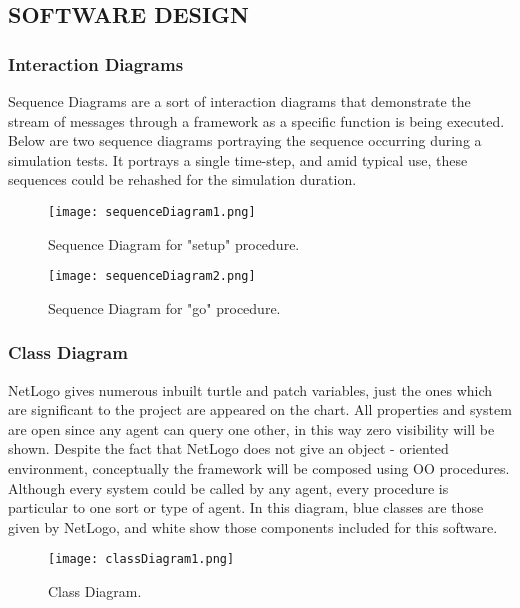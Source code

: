 \documentclass[11pt,a4paper]{article}
\begin{document}
\subsection{SOFTWARE DESIGN}

\subsubsection{\textbf{Interaction Diagrams}}

Sequence Diagrams are a sort of interaction diagrams that demonstrate the stream of messages through a framework as a specific function is being executed. Below are two sequence diagrams portraying the sequence occurring during a simulation tests. It portrays a single time-step, and amid typical use, these sequences could be rehashed for the simulation duration. \newpage

\begin{figure}[!ht]
\centering
\texttt{[image: sequenceDiagram1.png]}
\caption{\label{fig:sd1}Sequence Diagram for "setup" procedure.}
\end{figure}

\begin{figure}[!ht]
\centering
\texttt{[image: sequenceDiagram2.png]}
\caption{\label{fig:sd2}Sequence Diagram for "go" procedure.}
\end{figure}

\newpage
\subsubsection{\textbf{Class Diagram}}

NetLogo gives numerous inbuilt turtle and patch variables, just the ones which are significant to the project are appeared on the chart. All properties and system are open since any agent can query one other, in this way zero visibility will be shown. Despite the fact that NetLogo does not give an object - oriented environment, conceptually the framework will be composed using OO procedures. Although every system could be called by any agent, every procedure is particular to one sort or type of agent. In this diagram, blue classes are those given by NetLogo, and white show those components included for this software.

\begin{figure}[!ht]
\centering
\texttt{[image: classDiagram1.png]}
\caption{\label{fig:cd1}Class Diagram.}
\end{figure}
\end{document}
